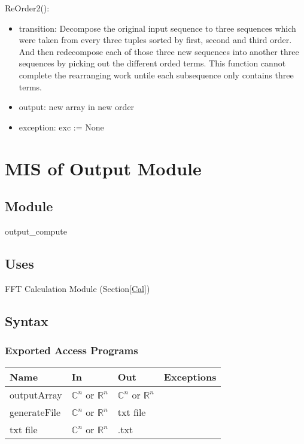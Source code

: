 \documentclass[12pt, titlepage]{article}
\begin{document}
ReOrder2():
\begin{itemize}
\item transition:  Decompose the original input sequence to three sequences which were taken from every three tuples sorted by first, second and third order.
And then redecompose each of those three new sequences into another three sequences by picking out the different orded terms.
This function cannot complete the rearranging work untile each subsequence only contains three terms.\\
\item output:  new array in new order
\item exception: exc := None

\end{itemize}


\section{MIS of Output  Module} \label{output}

\subsection{Module}

output\_compute

\subsection{Uses}
FFT Calculation Module (Section\ref{Cal})
\subsection{Syntax}

\subsubsection{Exported Access Programs}

\begin{center}
\begin{tabular}{p{2cm} p{4cm} p{4cm} p{2cm}}
\hline
\textbf{Name} & \textbf{In} & \textbf{Out} & \textbf{Exceptions} \\
\hline
outputArray & $\mathbb{C}^ n$ or $\mathbb{R}^ n$& $\mathbb{C}^ n$ or $\mathbb{R}^ n$& \\
generateFile& $\mathbb{C}^ n$ or $\mathbb{R}^ n$& txt file&\\
txt file & $\mathbb{C}^ n$ or $\mathbb{R}^ n$&.txt&\\


\hline
\end{tabular}
\end{center}
\end{document}
